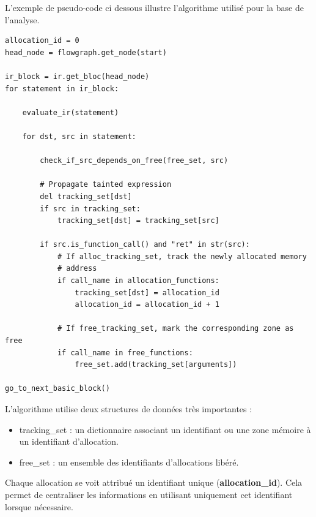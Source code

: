 L'exemple de pseudo-code ci dessous illustre l'algorithme utilisé pour la base de l'analyse.
\begin {lstlisting}[frame=single]
allocation_id = 0
head_node = flowgraph.get_node(start)

ir_block = ir.get_bloc(head_node)
for statement in ir_block:

    evaluate_ir(statement)

    for dst, src in statement:

        check_if_src_depends_on_free(free_set, src)

        # Propagate tainted expression
        del tracking_set[dst]
        if src in tracking_set:
            tracking_set[dst] = tracking_set[src]

        if src.is_function_call() and "ret" in str(src):
            # If alloc_tracking_set, track the newly allocated memory
            # address
            if call_name in allocation_functions:
                tracking_set[dst] = allocation_id
                allocation_id = allocation_id + 1

            # If free_tracking_set, mark the corresponding zone as free
            if call_name in free_functions:
                free_set.add(tracking_set[arguments])

go_to_next_basic_block()
\end{lstlisting}

L'algorithme utilise deux structures de données très importantes :

\begin{itemize}
        \item tracking\_set : un dictionnaire associant un identifiant ou une zone mémoire à un identifiant d'allocation.
        \item free\_set : un ensemble des identifiants d'allocations libéré.
\end{itemize}

Chaque allocation se voit attribué un identifiant unique (\textbf{allocation\_id}). Cela permet de centraliser les informations
en utilisant uniquement cet identifiant lorsque nécessaire.


